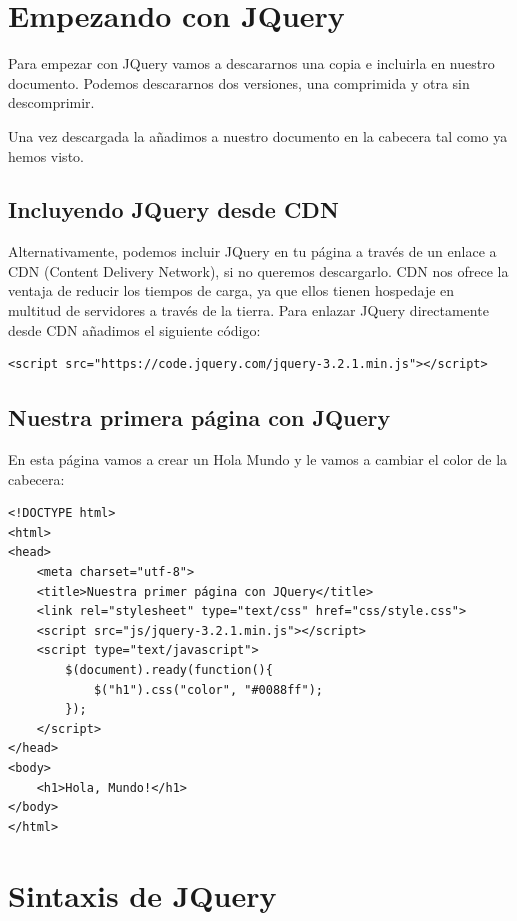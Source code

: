 \documentclass[11pt]{article}
\begin{document}
\section*{Empezando con JQuery}
\label{sec:orgeb0da4c}

Para empezar con JQuery vamos a descararnos una copia e incluirla en nuestro documento. Podemos descararnos dos versiones, una comprimida y otra sin 
descomprimir. 

Una vez descargada la añadimos a nuestro documento en la cabecera tal como ya hemos visto. 

\subsection*{Incluyendo JQuery desde CDN}
\label{sec:orgbca6cf5}

Alternativamente, podemos incluir JQuery en tu página a través de un enlace a CDN (Content Delivery Network), si no queremos descargarlo. CDN nos ofrece la ventaja de reducir los tiempos de carga, ya que ellos tienen hospedaje en multitud de servidores a través de la tierra. Para enlazar JQuery directamente desde CDN añadimos el siguiente código:

\begin{verbatim}
<script src="https://code.jquery.com/jquery-3.2.1.min.js"></script>
\end{verbatim}

\subsection*{Nuestra primera página con JQuery}
\label{sec:orgcad907d}

En esta página vamos a crear un Hola Mundo y le vamos a cambiar el color de la cabecera:

\begin{verbatim}
<!DOCTYPE html>
<html>
<head>
    <meta charset="utf-8">
    <title>Nuestra primer página con JQuery</title>
    <link rel="stylesheet" type="text/css" href="css/style.css">
    <script src="js/jquery-3.2.1.min.js"></script>
    <script type="text/javascript">
        $(document).ready(function(){
            $("h1").css("color", "#0088ff");
        });
    </script>
</head>
<body>
    <h1>Hola, Mundo!</h1>
</body>
</html>
\end{verbatim}

\section*{Sintaxis de JQuery}
\label{sec:orgaf50fdc}
\end{document}
